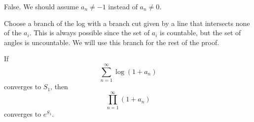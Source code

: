 \documentclass{homework}
\begin{document}
                                                                                                                                      \begin{solution}
                                                                                                                                      False. We should assume $a_n\neq -1$ instead of $a_n \neq 0.$

                                                                                                                                      Choose a branch of the log with a branch cut given by a line that intersects none of the $a_i$. This is always possible since the set of $a_i$ is countable, but the set of angles is uncountable. We will use this branch for the rest of the proof.
                                                                                                                                      \begin{lemma}\label{log_prod_convergence}
                                                                                                                                      If
                                                                                                                                      \[
                                                                                                                                      \sum_{n=1}^\infty \log(1 + a_n)
                                                                                                                                      \]
                                                                                                                                      converges to $S_1$, then
                                                                                                                                      \[
                                                                                                                                      \prod_{n=1}^\infty (1 + a_n)
                                                                                                                                      \]
                                                                                                                                      converges to $e^{S_1}$.


\end{lemma}
\end{solution}
\end{document}
